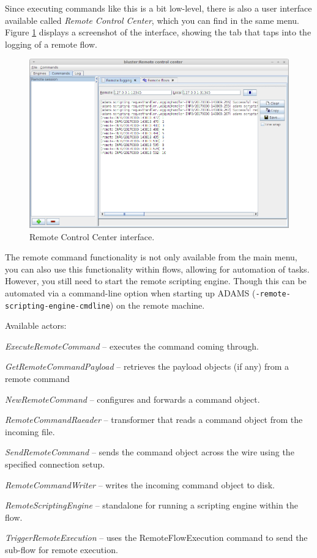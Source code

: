 Since executing commands like this is a bit low-level, there is also a
user interface available called \textit{Remote Control Center}, which you
can find in the same menu. Figure \ref{remote_control_center} displays a screenshot
of the interface, showing the tab that taps into the logging of a remote flow.

\begin{figure}[htb]
  \centering
  \includegraphics[width=12.0cm]{images/remote_control_center.png}
  \caption{Remote Control Center interface.}
  \label{remote_control_center}
\end{figure}

The remote command functionality is not only available from the main menu,
you can also use this functionality within flows, allowing for automation
of tasks. However, you still need to start the remote scripting engine. Though
this can be automated via a command-line option when starting up ADAMS
(\texttt{-remote-scripting-engine-cmdline}) on the remote machine.

Available actors:
\begin{tight_itemize}
  \item \textit{ExecuteRemoteCommand} -- executes the command coming through.
  \item \textit{GetRemoteCommandPayload} -- retrieves the payload objects (if
  any) from a remote command
  \item \textit{NewRemoteCommand} -- configures and forwards a command object.
  \item \textit{RemoteCommandRaeader} -- transformer that reads a command
  object from the incoming file.
  \item \textit{SendRemoteCommand} -- sends the command object across the wire
  using the specified connection setup.
  \item \textit{RemoteCommandWriter} -- writes the incoming command object to disk.
  \item \textit{RemoteScriptingEngine} -- standalone for running a scripting
  engine within the flow.
  \item \textit{TriggerRemoteExecution} -- uses the RemoteFlowExecution command
  to send the sub-flow for remote execution.
\end{tight_itemize}

